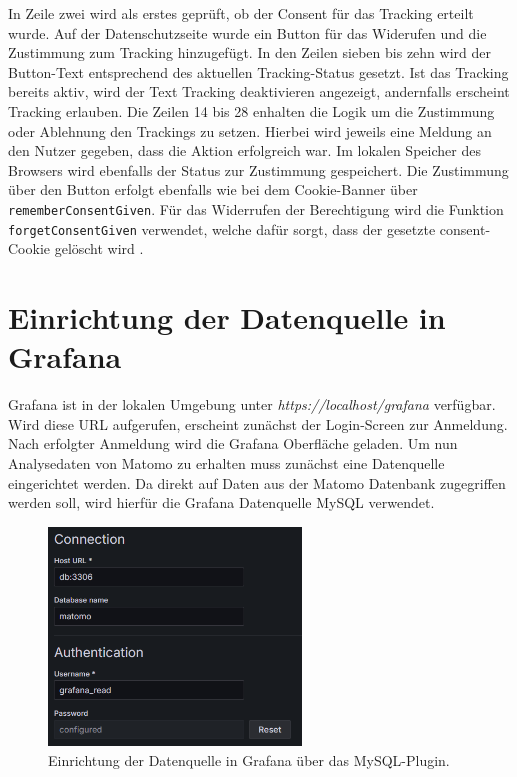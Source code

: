 \begin{figure}[H]
    \centering
    \begin{minipage}{\textwidth}
        
    \end{minipage}
\end{figure}

In Zeile zwei wird als erstes geprüft, ob der Consent für das Tracking erteilt wurde. Auf der Datenschutzseite wurde ein Button für das Widerufen und die Zustimmung zum Tracking hinzugefügt. In den Zeilen sieben bis zehn wird der Button-Text entsprechend des aktuellen Tracking-Status gesetzt. Ist das Tracking bereits aktiv, wird der Text \glqq Tracking deaktivieren\grqq{} angezeigt, andernfalls erscheint \glqq Tracking erlauben\grqq{}. Die Zeilen 14 bis 28 enhalten die Logik um die Zustimmung oder Ablehnung den Trackings zu setzen. Hierbei wird jeweils eine Meldung an den Nutzer gegeben, dass die Aktion erfolgreich war. Im lokalen Speicher des Browsers wird ebenfalls der Status zur Zustimmung gespeichert. Die Zustimmung über den Button erfolgt ebenfalls wie bei dem Cookie-Banner über \texttt{rememberConsentGiven}. Für das Widerrufen der Berechtigung wird die Funktion \texttt{forgetConsentGiven} verwendet, welche dafür sorgt, dass der gesetzte \glqq consent\grqq{}-Cookie gelöscht wird \parencite{MatomoConsent}.

\section{Einrichtung der Datenquelle in Grafana}
Grafana ist in der lokalen Umgebung unter \textit{https://localhost/grafana} verfügbar. Wird diese URL aufgerufen, erscheint zunächst der Login-Screen zur Anmeldung. Nach erfolgter Anmeldung wird die Grafana Oberfläche geladen. Um nun Analysedaten von Matomo zu erhalten muss zunächst eine Datenquelle eingerichtet werden. Da direkt auf Daten aus der Matomo Datenbank zugegriffen werden soll, wird hierfür die Grafana Datenquelle \glqq MySQL\grqq{} verwendet.

\begin{figure}[H]
    \centering
    \includegraphics[width=0.6\textwidth, keepaspectratio]{images/datasource.png}
    \caption{Einrichtung der Datenquelle in Grafana über das MySQL-Plugin.}
    \label{fig:datasource}
\end{figure}

